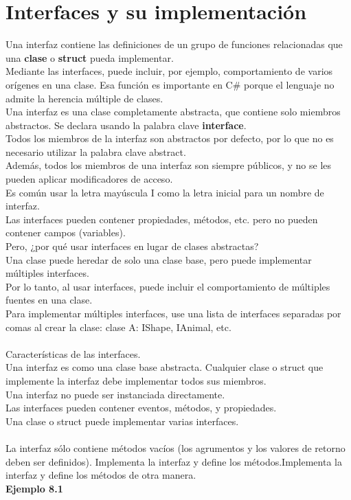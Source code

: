\documentclass[12pt,a4paper]{report}
\begin{document}
\section{Interfaces y su implementación}
Una interfaz contiene las definiciones de un grupo de funciones relacionadas que una \textbf{clase} o\textbf{ struct} pueda implementar.\\ Mediante las interfaces, puede incluir, por ejemplo, comportamiento de varios orígenes en una clase. Esa función es importante en C\# porque el lenguaje no admite la herencia múltiple de clases.\\Una interfaz es una clase completamente abstracta, que contiene solo miembros abstractos. Se declara usando la palabra clave \textbf{interface}.\\Todos los miembros de la interfaz son abstractos por defecto, por lo que no es necesario utilizar la palabra clave abstract.\\Además, todos los miembros de una interfaz son siempre públicos, y no se les pueden aplicar modificadores de acceso.\\Es común usar la letra mayúscula I como la letra inicial para un nombre de interfaz.\\Las interfaces pueden contener propiedades, métodos, etc. pero no pueden contener campos (variables).\\Pero, ¿por qué usar interfaces en lugar de clases abstractas?\\Una clase puede heredar de solo una clase base, pero puede implementar múltiples interfaces.\\Por lo tanto, al usar interfaces, puede incluir el comportamiento de múltiples fuentes en una clase.\\Para implementar múltiples interfaces, use una lista de interfaces separadas por comas al crear la clase: clase A: IShape, IAnimal, etc.\\\\Características de las interfaces.\\Una interfaz es como una clase base abstracta. Cualquier clase o struct que implemente la interfaz debe implementar todos sus miembros.\\Una interfaz no puede ser instanciada directamente.\\Las interfaces pueden contener eventos, métodos, y propiedades.\\Una clase o struct puede implementar varias interfaces.\\\\La interfaz sólo contiene métodos vacíos (los agrumentos y los valores de retorno deben ser definidos). Implementa la interfaz y define los métodos.Implementa la interfaz y define los métodos de otra manera.\\\textbf{Ejemplo 8.1}
\end{document}
